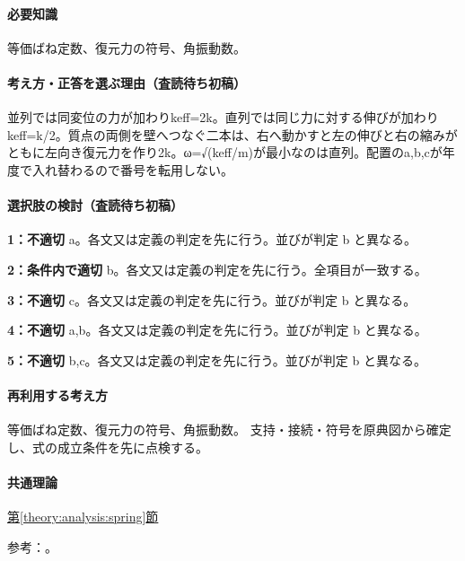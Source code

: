 \paragraph{必要知識} 等価ばね定数、復元力の符号、角振動数。

\paragraph{考え方・正答を選ぶ理由（査読待ち初稿）} 並列では同変位の力が加わりkeff=\allowbreak{}2k。直列では同じ力に対する伸びが加わりkeff=\allowbreak{}k/2。質点の両側を壁へつなぐ二本は、右へ動かすと左の伸びと右の縮みがともに左向き復元力を作り2k。ω=√(keff/m)が最小なのは直列。配置のa,b,cが年度で入れ替わるので番号を転用しない。

\paragraph{選択肢の検討（査読待ち初稿）}\mbox{}\par

\noindent\textbf{1：不適切} a。各文又は定義の判定を先に行う。並びが判定 b と異なる。\par

\noindent\textbf{2：条件内で適切} b。各文又は定義の判定を先に行う。全項目が一致する。\par

\noindent\textbf{3：不適切} c。各文又は定義の判定を先に行う。並びが判定 b と異なる。\par

\noindent\textbf{4：不適切} a,b。各文又は定義の判定を先に行う。並びが判定 b と異なる。\par

\noindent\textbf{5：不適切} b,c。各文又は定義の判定を先に行う。並びが判定 b と異なる。\par

\paragraph{再利用する考え方} 等価ばね定数、復元力の符号、角振動数。 支持・接続・符号を原典図から確定し、式の成立条件を先に点検する。

\paragraph{共通理論} \hyperref[theory:analysis:spring]{第\ref*{theory:analysis:spring}節}

\par 参考：\cite{analysis57_shm}。

